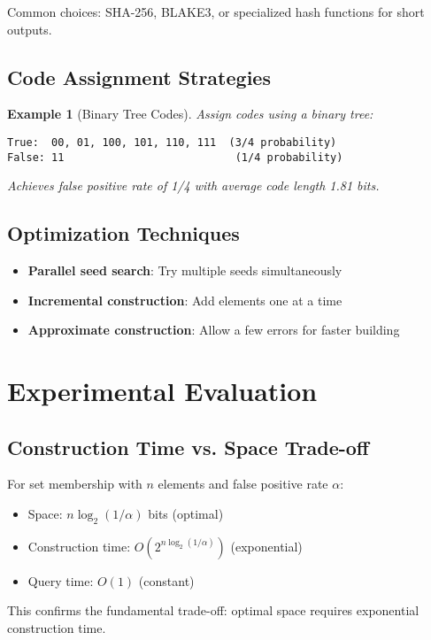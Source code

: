 \documentclass[11pt,final,hidelinks]{article}
\newtheorem{example}[theorem]{Example}
\newcommand{\fprate}{\alpha}
\begin{document}
Common choices: SHA-256, BLAKE3, or specialized hash functions for short outputs.

\subsection{Code Assignment Strategies}

\begin{example}[Binary Tree Codes]
Assign codes using a binary tree:
\begin{verbatim}
True:  00, 01, 100, 101, 110, 111  (3/4 probability)
False: 11                           (1/4 probability)
\end{verbatim}
Achieves false positive rate of 1/4 with average code length 1.81 bits.
\end{example}

\subsection{Optimization Techniques}

\begin{itemize}
    \item \textbf{Parallel seed search}: Try multiple seeds simultaneously
    \item \textbf{Incremental construction}: Add elements one at a time
    \item \textbf{Approximate construction}: Allow a few errors for faster building
\end{itemize}

\section{Experimental Evaluation}

\subsection{Construction Time vs. Space Trade-off}

For set membership with $n$ elements and false positive rate $\fprate$:
\begin{itemize}
    \item Space: $n \log_2(1/\fprate)$ bits (optimal)
    \item Construction time: $O(2^{n \log_2(1/\fprate)})$ (exponential)
    \item Query time: $O(1)$ (constant)
\end{itemize}

This confirms the fundamental trade-off: optimal space requires exponential construction time.
\end{document}
